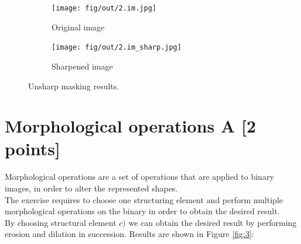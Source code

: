 \documentclass[tikz,14pt,fleqn]{article}
\begin{document}
\begin{figure}[h!]
    \begin{subfigure}[b]{0.5\linewidth}
        \centering
    \texttt{[image: fig/out/2.im.jpg]}
    \caption{Original image}
    \end{subfigure}
    \begin{subfigure}[b]{0.5\linewidth}
        \centering
        \texttt{[image: fig/out/2.im\_sharp.jpg]}
        \caption{Sharpened image}
    \end{subfigure}
    \caption{Unsharp masking results.}
    \label{fig:2.4}
\end{figure}
\section{Morphological operations A [2 points]}
Morphological operations are a set of operations that are applied to binary images, in order to alter the represented shapes.\\
The exercise requires to choose one structuring element and perform multiple morphological operations on the binary in order to obtain the desired result.\\
By choosing structural element $c)$ we can obtain the desired result by performing erosion and dilation in succession. Results are shown in Figure \ref{fig:3}:
\end{document}
